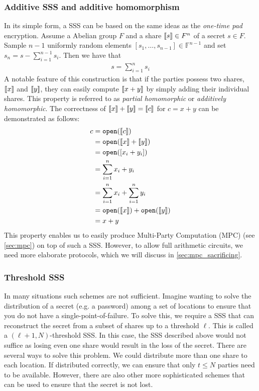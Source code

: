 \documentclass[11pt]{report}
\theoremstyle{definition}
\theoremstyle{plain}
\begin{document}
\subsubsection{Additive SSS and additive homomorphism}\label{sec:additive-sss}

In its simple form, a SSS can be based on the same ideas as the \textit{one-time pad} encryption. Assume a Abelian group $F$ and a share $\llbracket s \rrbracket \in F^n$ of a secret $s \in F$. Sample $n-1$ uniformly random elements $[s_1, \dots, s_{n-1}] \in \mathbb{F}^{n-1}$ and set $s_n = s - \sum_{i=1}^{n-1} s_i$. Then we have that
\begin{align*}
  s = \sum_{i=1}^{n} s_i
\end{align*}
A notable feature of this construction is that if the parties possess two shares, $\llbracket x \rrbracket$ and $\llbracket y \rrbracket$, they can easily compute $\llbracket x + y \rrbracket$ by simply adding their individual shares. This property is referred to as \textit{partial homomorphic} or \textit{additively homomorphic}. The correctness of $\llbracket x \rrbracket + \llbracket y \rrbracket = \llbracket c \rrbracket$ for $c = x + y$ can be demonstrated as follows:
\begin{align*}
  c & = \texttt{open}(\llbracket c \rrbracket)                         \\
    & = \texttt{open}(\llbracket x \rrbracket + \llbracket y \rrbracket)                \\
    & = \texttt{open}([x_i + y_i])                    \\
    & = \sum_{i=1}^{n} x_i + y_i                      \\
    & = \sum_{i=1}^{n} x_i + \sum_{i=1}^{n} y_i       \\
    & = \texttt{open}(\llbracket x \rrbracket) + \texttt{open}(\llbracket y \rrbracket) \\
    & = x + y
\end{align*}
This property enables us to easily produce Multi-Party Computation (MPC) (see \autoref{sec:mpc}) on top of such a SSS\@. However, to allow full arithmetic circuits, we need more elaborate protocols, which we will discuss in \autoref{sec:mpc_sacrificing}.

\subsubsection{Threshold SSS}\label{sub:threshold-sss}

In many situations such schemes are not sufficient. Imagine wanting to solve the distribution of a secret (e.g. a password) among a set of locations to ensure that you do not have a single-point-of-failure. To solve this, we require a SSS that can reconstruct the secret from a subset of shares up to a threshold $\ell$. This is called a $(\ell + 1, N)$-threshold SSS\@.
In this case, the SSS described above would not suffice as losing even one share would result in the loss of the secret. There are several ways to solve this problem. We could distribute more than one share to each location. If distributed correctly, we can ensure that only $t \leq N$ parties need to be available. However, there are also other more sophisticated schemes that can be used to ensure that the secret is not lost.
\end{document}
